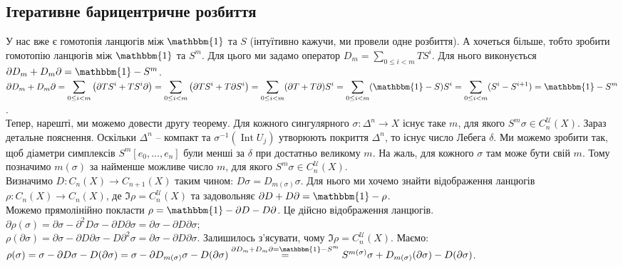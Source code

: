 \documentclass[a4paper, 10pt]{article}
\theoremstyle{theoremdd}
\theoremstyle{theoremdd}
\theoremstyle{theoremdd}
\theoremstyle{theoremdd}
\theoremstyle{theoremdd}
\theoremstyle{theoremdd}
\theoremstyle{theoremdd}
\theoremstyle{theoremdd}
\theoremstyle{theoremdd}
\theoremstyle{theoremdd}
\theoremstyle{theoremdd}
\theoremstyle{theoremdd}
\theoremstyle{theoremdd}
\theoremstyle{theoremdd}
\theoremstyle{theoremdd}
\DeclareMathOperator{\Int}{Int}
\begin{document}
\subsection{Ітеративне барицентричне розбиття}
У нас вже є гомотопія ланцюгів між $\mathbbm{1}$ та $S$ (інтуїтивно кажучи, ми провели одне розбиття). А хочеться більше, тобто зробити гомотопію ланцюгів між $\mathbbm{1}$ та $S^m$. Для цього ми задамо оператор $D_m = \displaystyle\sum_{0 \leq i < m} TS^i$. Для нього виконується $\partial D_m + D_m \partial = \mathbbm{1} - S^m$.\\
$\partial D_m + D_m \partial = \displaystyle\sum_{0 \leq i < m} \left( \partial TS^i + TS^i \partial \right) = \sum_{0 \leq i < m} \left( \partial TS^i + T\partial S^i\right) = \sum_{0 \leq i < m} (\partial T + T \partial)S^i = \sum_{0 \leq i < m} (\mathbbm{1} - S)S^i = \sum_{0 \leq i < m} (S^i - S^{i+1}) = \mathbbm{1} - S^m$.
\bigskip \\
Тепер, нарешті, ми можемо довести другу теорему. Для кожного сингулярного $\sigma \colon \Delta^n \to X$ існує таке $m$, для якого $S^m \sigma \in C_n^{\mathcal{U}}(X)$. Зараз детальне пояснення. Оскільки $\Delta^n$ -- компакт та $\sigma^{-1}(\Int U_j)$ утворюють покриття $\Delta^n$, то існує число Лебега $\delta$. Ми можемо зробити так, щоб діаметри симплексів $S^m[e_0,\dots,e_n]$ були менші за $\delta$ при достатньо великому $m$. На жаль, для кожного $\sigma$ там може бути свій $m$. Тому позначимо $m(\sigma)$ за найменше можливе число $m$, для якого $S^m \sigma \in C_n^{\mathcal{U}}(X)$.\\
Визначимо $D \colon C_n(X) \to C_{n+1}(X)$ таким чином: $D\sigma = D_{m(\sigma)} \sigma$. Для нього ми хочемо знайти відображення ланцюгів $\rho \colon C_n(X) \to C_n(X)$, де $\Im \rho = C_n^\mathcal{U}(X)$ та задовольняє $\partial D + D \partial = \mathbbm{1} - \rho$.\\
Можемо прямолінійно покласти $\rho = \mathbbm{1} - \partial D - D \partial$. Це дійсно відображення ланцюгів.\\
$\partial \rho(\sigma) = \partial \sigma - \partial^2 D\sigma - \partial D\partial \sigma = \partial \sigma - \partial D \partial \sigma$;\\
$\rho(\partial\sigma) = \partial \sigma - \partial D \partial \sigma - D \partial^2 \sigma = \partial \sigma - \partial D \partial \sigma$.
Залишилось з'ясувати, чому $\Im \rho = C_n^\mathcal{U}(X)$. Маємо:\\
$\rho(\sigma) = \sigma - \partial D \sigma - D(\partial \sigma) = \sigma - \partial D_{m(\sigma)}\sigma - D(\partial \sigma) \overset{\partial D_m + D_m \partial = \mathbbm{1} - S^m}{=} S^{m(\sigma)}\sigma + D_{m(\sigma)}(\partial \sigma) - D(\partial \sigma)$.\\
\end{document}
